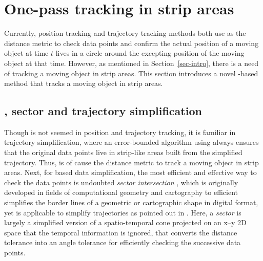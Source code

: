 

\section{One-pass tracking in strip areas}
\label{sec:strip}


Currently, position tracking and trajectory tracking methods both use \sed as the distance metric to check data points and confirm the actual position of a moving object at time $t$ lives in a circle around the excepting position of the moving object at that time.
However, as mentioned in Section~\ref{sec-intro}, there is a need of tracking a moving object in strip areas.
This section introduces a novel \ped-based method that tracks a moving object in strip areas.


  

\subsection{\ped, sector and trajectory simplification}
\label{sec:sector-in-simp}

Though \ped is not seemed in position and trajectory tracking, it is familiar in trajectory simplification, where an error-bounded algorithm using \ped always ensures that the original data points live in strip-like areas built from the simplified trajectory. 
Thus, \ped is of cause the distance metric to track a moving object in strip areas.
%
Next, for \ped based data simplification, the most efficient and effective way to check the data points is undoubted \textit{sector intersection} \cite{Williams:Longest, Sklansky:Cone, Dunham:Cone, Zhao:Sleeve}, which is originally developed in fields of computational geometry and cartography to efficient simplifies the border lines of a geometric or cartographic shape in digital format, yet is applicable to simplify trajectories as pointed out in \cite{Lin:Cised}. Here, a \emph{sector} is largely a simplified version of a spatio-temporal cone projected on an x--y 2D space that the temporal information is ignored, that converts the \ped distance tolerance into an angle tolerance for efficiently checking the successive data points.

